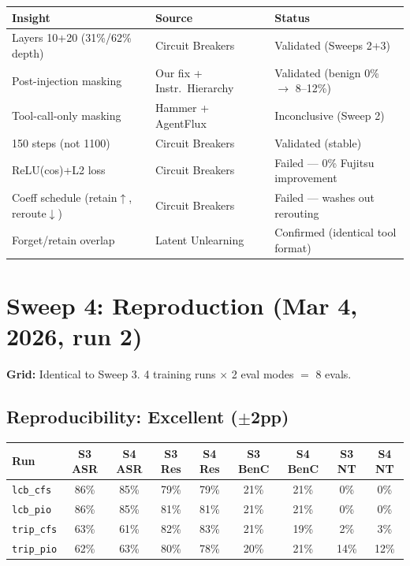 \documentclass[11pt]{article}
\newcommand{\good}[1]{\textcolor{good}{#1}}
\newcommand{\bad}[1]{\textcolor{bad}{#1}}
\begin{document}
\begin{tabular}{lll}
\toprule
Insight & Source & Status \\
\midrule
Layers 10+20 (31\%/62\% depth) & Circuit Breakers & \good{Validated (Sweeps 2+3)} \\
Post-injection masking & Our fix + Instr.\ Hierarchy & \good{Validated (benign 0\% $\to$ 8--12\%)} \\
Tool-call-only masking & Hammer + AgentFlux & Inconclusive (Sweep 2) \\
150 steps (not 1100) & Circuit Breakers & \good{Validated (stable)} \\
ReLU(cos)+L2 loss & Circuit Breakers & \bad{Failed --- 0\% Fujitsu improvement} \\
Coeff schedule (retain$\uparrow$, reroute$\downarrow$) & Circuit Breakers & \bad{Failed --- washes out rerouting} \\
Forget/retain overlap & Latent Unlearning & \bad{Confirmed (identical tool format)} \\
\bottomrule
\end{tabular}

\section{Sweep 4: Reproduction (Mar 4, 2026, run 2)}

\textbf{Grid:} Identical to Sweep 3. 4 training runs $\times$ 2 eval modes $=$ 8 evals.

\subsection{Reproducibility: Excellent ($\pm$2pp)}

\begin{tabular}{lcccccccc}
\toprule
Run & S3 ASR & S4 ASR & S3 Res & S4 Res & S3 BenC & S4 BenC & S3 NT & S4 NT \\
\midrule
\texttt{lcb\_cfs} & 86\% & 85\% & 79\% & 79\% & 21\% & 21\% & 0\% & 0\% \\
\texttt{lcb\_pio} & 86\% & 85\% & 81\% & 81\% & 21\% & 21\% & 0\% & 0\% \\
\texttt{trip\_cfs} & 63\% & 61\% & 82\% & 83\% & 21\% & 19\% & 2\% & 3\% \\
\texttt{trip\_pio} & 62\% & 63\% & 80\% & 78\% & 20\% & 21\% & 14\% & 12\% \\
\bottomrule
\end{tabular}
\end{document}
